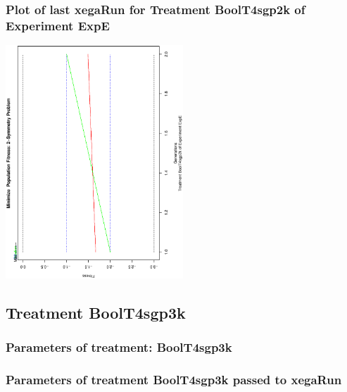 \documentclass[18pt,c]{beamer}
\makeatletter
\def\beamer@writeslidentry@miniframesoff{%
  \expandafter\beamer@ifempty\expandafter{\beamer@framestartpage}{}%
  {%
   \clearpage\beamer@notesactions%
  }
}
\newcommand*{\miniframesoff}{\let\beamer@writeslidentry=\beamer@writeslidentry@miniframesoff}
\makeatother
\begin{document}
 \begin{frame}
 \frametitle{ Plot of last xegaRun for Treatment BoolT4sgp2k of Experiment ExpE }
 \begin{center}
\includegraphics[width=0.5\textwidth, angle=-90]
{ExpEPlotPopStatsFigure000.eps}
 \end{center}
 \label{report/ExpEPlotPopStatsFigure000.eps}  
 \end{frame}

\miniframesoff
\subsection{Treatment BoolT4sgp3k}

 \begin{frame}
 \fontsize{8pt}{9pt}\selectfont
 \frametitle{  Parameters of treatment: BoolT4sgp3k 
 }

 \label{ExpEtParmTable004.tex}  
 \end{frame}


 \begin{frame}
 \fontsize{8pt}{9pt}\selectfont
 \frametitle{  Parameters of treatment BoolT4sgp3k passed to xegaRun
 }

 \label{ExpEtParmTable005.tex}  
 \end{frame}
\end{document}
